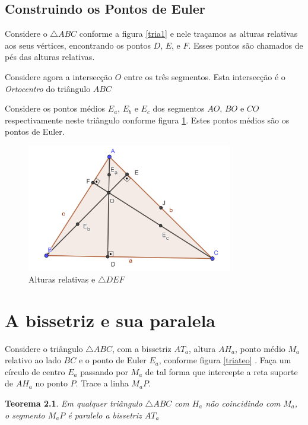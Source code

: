 \documentclass[12pt, openright, a4paper, brazil, openany, oneside]{abntex2}
\newtheorem{teo}{Teorema}
\begin{document}
\section{Construindo os Pontos de Euler}

Considere o $\triangle ABC$ conforme a figura \ref{tria1} e nele traçamos as alturas relativas aos seus vértices, encontrando os pontos $D$, $E$, e $F$. Esses pontos são chamados de pés das alturas relativas.

\newpage

Considere agora a intersecção $O$ entre os três segmentos. Esta intersecção é o \textit{Ortocentro} do triângulo $ABC$

Considere os pontos médios $E_a$, $E_b$ e $E_c$ dos segmentos $AO$, $BO$ e $CO$ respectivamente neste triângulo conforme figura \ref{tria4}. Estes pontos médios são os pontos de Euler.

\begin{figure}[h]

    \center

    \includegraphics[width=9cm]{triangulo4.png}
    \caption{Alturas relativas e $\triangle DEF$ \label{tria4}}
    
\end{figure}

\chapter{A bissetriz e sua paralela}

Considere o triângulo $\triangle ABC$, com a bissetriz $AT_a$, altura $AH_a$, ponto médio $M_a$ relativo ao lado $BC$ e o ponto de Euler $E_a$, conforme figura \ref{triateo} . Faça um círculo de centro $E_a$ passando por $M_a$ de tal forma que intercepte a reta suporte de $AH_a$ no ponto $P$. Trace a linha $M_{a}P$.

\begin{teo}\label{teo1}
	Em qualquer triângulo $\triangle ABC$ com $H_a$ não coincidindo com $M_a$, o segmento $M_{a}P$ é paralelo a bissetriz $AT_a$
\end{teo}
\end{document}
